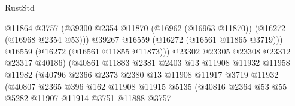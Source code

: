\begin{lexlean}{RustStd}
\begin{coremodule}
                                          @11864
                                          @3757
                                          (@39300
                                            @2354
                                            @11870
                                            (@16962 (@16963 @11870))
                                            (@16272 (@16968 @2354 @53)))
                                          @39267
                                          @16559
                                          (@16272 (@16561 @11865 @3719)))
                                        @16559
                                        (@16272 (@16561 @11855 @11873)))
                                      @23302
                                      @23305
                                      @23308
                                      @23312
                                      @23317
                                      @40186)
                                    (@40861
                                      @11883
                                      @2381
                                      @2403
                                      @13
                                      @11908
                                      @11932
                                      @11958
                                      @11982
                                      (@40796
                                        @2366
                                        @2373
                                        @2380
                                        @13
                                        @11908
                                        @11917
                                        @3719
                                        @11932
                                        (@40807
                                          @2365
                                          @396
                                          @162
                                          @11908
                                          @11915
                                          @5135
                                          (@40816
                                            @2364
                                            @53
                                            @55
                                            @5282
                                            @11907
                                            @11914
                                            @3751
                                            @11888
                                            @3757

\end{coremodule}
\end{lexlean}
